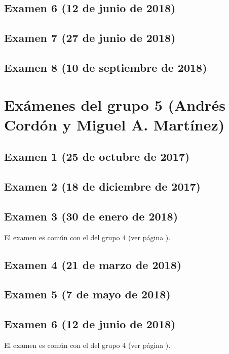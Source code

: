 \documentclass[a4paper,12pt,twoside]{book}
\begin{document}
\subsection{Examen 6 (12 de junio de 2018)}
 \label{examen_17_18_4_6}
\subsection{Examen 7 (27 de junio de 2018)}
 \label{examen_17_18_4_7}
\subsection{Examen 8 (10 de septiembre de 2018)}
 \label{examen_17_18_4_8}

\section{Exámenes del grupo 5 (Andrés Cordón y Miguel A. Martínez)}
\subsection{Examen 1 (25 de octubre de 2017)}
\subsection{Examen 2 (18 de diciembre de 2017)}
\subsection{Examen 3 (30 de enero de 2018)}
El examen es común con el del grupo 4 (ver página \pageref{examen_17_18_4_3}).
\subsection{Examen 4 (21 de marzo de 2018)}
\subsection{Examen 5 (7 de mayo de 2018)}
\subsection{Examen 6 (12 de junio de 2018)}
El examen es común con el del grupo 4 (ver página \pageref{examen_17_18_4_6}).
\end{document}
